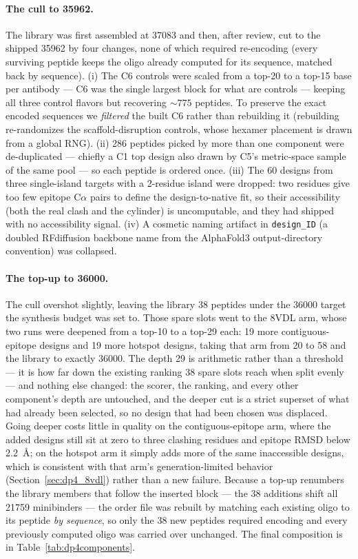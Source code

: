 \paragraph{The cull to \num{35962}.} The library was first assembled at \num{37083} and then, after
review, cut to the shipped \num{35962} by four changes, none of which required re-encoding (every
surviving peptide keeps the oligo already computed for its sequence, matched back by sequence). (i) The
C6 controls were scaled from a top-\num{20} to a top-\num{15} base per antibody --- C6 was the single
largest block for what are controls --- keeping all three control flavors but recovering $\sim\!\num{775}$
peptides. To preserve the exact encoded sequences we \emph{filtered} the built C6 rather than rebuilding
it (rebuilding re-randomizes the scaffold-disruption controls, whose hexamer placement is drawn from a
global RNG). (ii) \num{286} peptides picked by more than one component were de-duplicated --- chiefly a C1
top design also drawn by C5's metric-space sample of the same pool --- so each peptide is ordered once.
(iii) The \num{60} designs from three single-island targets with a \num{2}-residue island were dropped:
two residues give too few epitope C$\alpha$ pairs to define the design-to-native fit, so their
accessibility (both the real clash and the cylinder) is uncomputable, and they had shipped with no
accessibility signal. (iv) A cosmetic naming artifact in \texttt{design\_ID} (a doubled RFdiffusion
backbone name from the AlphaFold3 output-directory convention) was collapsed.

\paragraph{The top-up to \num{36000}.} The cull overshot slightly, leaving the library \num{38} peptides
under the \num{36000} target the synthesis budget was set to. Those spare slots went to the 8VDL arm,
whose two runs were deepened from a top-\num{10} to a top-\num{29} each: \num{19} more contiguous-epitope
designs and \num{19} more hotspot designs, taking that arm from \num{20} to \num{58} and the library to
exactly \num{36000}. The depth \num{29} is arithmetic rather than a threshold --- it is how far down the
existing ranking \num{38} spare slots reach when split evenly --- and nothing else changed: the scorer,
the ranking, and every other component's depth are untouched, and the deeper cut is a strict superset of
what had already been selected, so no design that had been chosen was displaced. Going deeper costs
little in quality on the contiguous-epitope arm, where the added designs still sit at zero to three
clashing residues and epitope RMSD below \num{2.2}~\AA; on the hotspot arm it simply adds more of the
same inaccessible designs, which is consistent with that arm's generation-limited behavior
(Section~\ref{sec:dp4_8vdl}) rather than a new failure. Because a top-up renumbers the library members that
follow the inserted block --- the \num{38} additions shift all \num{21759} minibinders --- the order file
was rebuilt by matching each existing oligo to its peptide \emph{by sequence}, so only the \num{38} new
peptides required encoding and every previously computed oligo was carried over unchanged. The final
composition is in Table~\ref{tab:dp4components}.

